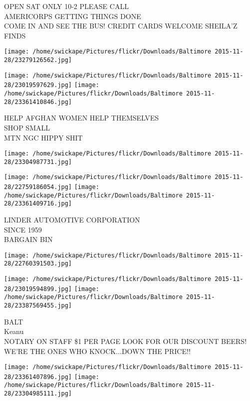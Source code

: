 \documentclass[10pt,letterpaper]{article}
\begin{document}
OPEN SAT ONLY 10{-}2 PLEASE CALL\\
AMERICORPS GETTING THINGS DONE\\
COME IN AND SEE THE BUS!  CREDIT CARDS WELCOME SHEILA'Z FINDS
\pagebreak

\texttt{[image: /home/swickape/Pictures/flickr/Downloads/Baltimore 2015-11-28/23279126562.jpg]}

\vspace{0.25in}
\texttt{[image: /home/swickape/Pictures/flickr/Downloads/Baltimore 2015-11-28/23019597629.jpg]}
\texttt{[image: /home/swickape/Pictures/flickr/Downloads/Baltimore 2015-11-28/23361410846.jpg]}

HELP AFGHAN WOMEN HELP THEMSELVES\\
SHOP SMALL\\
MTN NGC HIPPY SHIT
\pagebreak

\texttt{[image: /home/swickape/Pictures/flickr/Downloads/Baltimore 2015-11-28/23304987731.jpg]}

\vspace{0.25in}
\texttt{[image: /home/swickape/Pictures/flickr/Downloads/Baltimore 2015-11-28/22759186054.jpg]}
\texttt{[image: /home/swickape/Pictures/flickr/Downloads/Baltimore 2015-11-28/23361409716.jpg]}

LINDER AUTOMOTIVE CORPORATION\\
SINCE 1959\\
BARGAIN BIN
\pagebreak

\texttt{[image: /home/swickape/Pictures/flickr/Downloads/Baltimore 2015-11-28/22760391503.jpg]}

\vspace{0.25in}
\texttt{[image: /home/swickape/Pictures/flickr/Downloads/Baltimore 2015-11-28/23019594899.jpg]}
\texttt{[image: /home/swickape/Pictures/flickr/Downloads/Baltimore 2015-11-28/23387569455.jpg]}

BALT\\
Keanu\\
NOTARY ON STAFF \$1 PER PAGE LOOK FOR OUR DISCOUNT BEERS!  WE'RE THE ONES WHO KNOCK...DOWN THE PRICE!!
\pagebreak

\texttt{[image: /home/swickape/Pictures/flickr/Downloads/Baltimore 2015-11-28/23361407896.jpg]}
\texttt{[image: /home/swickape/Pictures/flickr/Downloads/Baltimore 2015-11-28/23304985111.jpg]}
\end{document}
